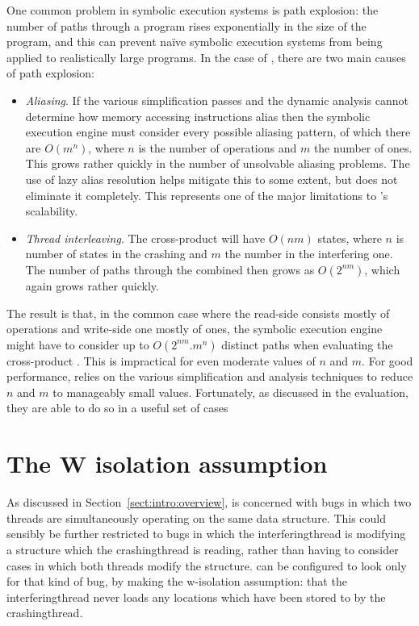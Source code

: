 One common problem in symbolic execution systems is path explosion:
the number of paths through a program rises exponentially in the size
of the program, and this can prevent na\"ive symbolic execution
systems from being applied to realistically large programs.  In the
case of \technique, there are two main causes of path explosion:
\begin{itemize}
\item
  \textit{Aliasing}.  If the various simplification passes and the
  dynamic analysis cannot determine how memory accessing instructions
  alias then the symbolic execution engine must consider every
  possible aliasing pattern, of which there are $O(m^n)$, where $n$ is
  the number of  operations and $m$ the number of
   ones.  This grows rather quickly
  in the number of unsolvable aliasing problems.  The use of lazy
  alias resolution helps mitigate this to some extent, but does not
  eliminate it completely.  This represents one of the major
  limitations to \technique's scalability.
\item
  \textit{Thread interleaving}.  The cross-product {\StateMachine}
  will have $O(nm)$ states, where $n$ is number of states in the
  crashing {\StateMachine} and $m$ the number in the interfering one.
  The number of paths through the combined {\StateMachine} then grows
  as $O(2^{nm})$, which again grows rather quickly.
\end{itemize}
The result is that, in the common case where the read-side
{\StateMachine} consists mostly of  operations and
write-side one mostly of  ones, the symbolic execution
engine might have to consider up to $O(2^{nm}.m^n)$ distinct paths
when evaluating the cross-product {\StateMachine}.  This is
impractical for even moderate values of $n$ and $m$.  For good
performance, {\technique} relies on the various simplification and
analysis techniques to reduce $n$ and $m$ to manageably small values.
Fortunately, as discussed in the evaluation, they are able to do so in
a useful set of cases

\section{The W isolation assumption}
\label{sect:derive:w_isolation}


As discussed in Section~\ref{sect:intro:overview}, {\technique} is
concerned with bugs in which two threads are simultaneously operating
on the same data structure.  This could sensibly be further restricted
to bugs in which the \gls{interferingthread} is modifying a structure
which the \gls{crashingthread} is reading, rather than having to
consider cases in which both threads modify the structure.
{\Implementation} can be configured to look only for that kind of bug,
by making the \gls{w-isolation} assumption: that the
\gls{interferingthread} never loads any locations which have been
stored to by the \gls{crashingthread}.


